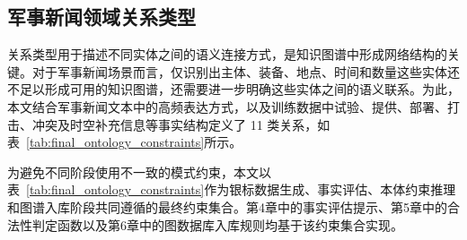 \subsection{军事新闻领域关系类型}

关系类型用于描述不同实体之间的语义连接方式，是知识图谱中形成网络结构的关键。对于军事新闻场景而言，仅识别出主体、装备、地点、时间和数量这些实体还不足以形成可用的知识图谱，还需要进一步明确这些实体之间的语义联系。为此，本文结合军事新闻文本中的高频表达方式，以及训练数据中试验、提供、部署、打击、冲突及时空补充信息等事实结构定义了 11 类关系，如表~\ref{tab:final_ontology_constraints}所示。

为避免不同阶段使用不一致的模式约束，本文以表~\ref{tab:final_ontology_constraints}作为银标数据生成、事实评估、本体约束推理和图谱入库阶段共同遵循的最终约束集合。第4章中的事实评估提示、第5章中的合法性判定函数以及第6章中的图数据库入库规则均基于该约束集合实现。

